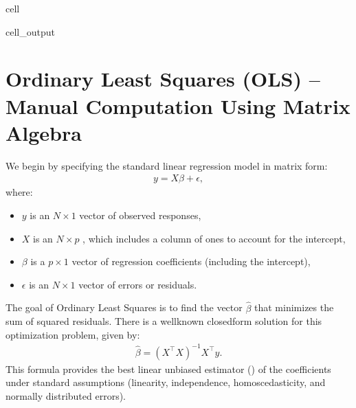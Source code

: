 \documentclass[letterpaper,10pt,english]{jupyterBook}
\begin{document}
\begin{sphinxuseclass}{cell}
\begin{sphinxVerbatimOutput}
\begin{sphinxuseclass}{cell_output}
\noindent{}

\end{sphinxuseclass}\end{sphinxVerbatimOutput}

\end{sphinxuseclass}

\section{Ordinary Least Squares (OLS) – Manual Computation Using Matrix Algebra}
\label{\detokenize{02:ordinary-least-squares-ols-manual-computation-using-matrix-algebra}}
\sphinxAtStartPar
We begin by specifying the standard linear regression model in matrix form:
\begin{equation*}
\begin{split}
y = X \beta + \epsilon,
\end{split}
\end{equation*}
\sphinxAtStartPar
where:
\begin{itemize}
\item {} 
\sphinxAtStartPar
\(y\) is an \(N \times 1\) vector of observed responses,

\item {} 
\sphinxAtStartPar
\(X\) is an \(N \times p\) , which includes a column of ones to account for the intercept,

\item {} 
\sphinxAtStartPar
\(\beta\) is a \(p \times 1\) vector of regression coefficients (including the intercept),

\item {} 
\sphinxAtStartPar
\(\epsilon\) is an \(N \times 1\) vector of errors or residuals.

\end{itemize}

\sphinxAtStartPar
The goal of Ordinary Least Squares is to find the vector \(\hat{\beta}\) that minimizes the sum of squared residuals. There is a well\sphinxhyphen{}known closed\sphinxhyphen{}form solution for this optimization problem, given by:
\begin{equation*}
\begin{split}
\hat{\beta} = (X^\top X)^{-1} X^\top y.
\end{split}
\end{equation*}
\sphinxAtStartPar
This formula provides the best linear unbiased estimator () of the coefficients under standard assumptions (linearity, independence, homoscedasticity, and normally distributed errors).
\end{document}
